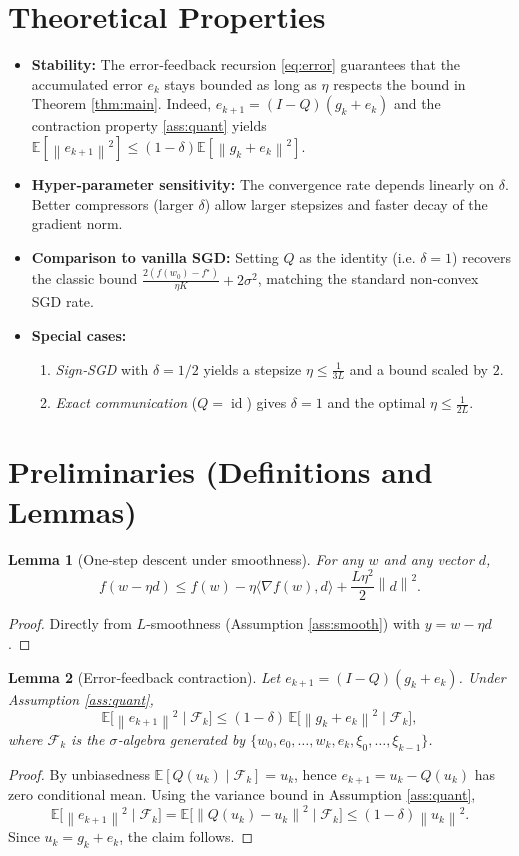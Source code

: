 \documentclass{article}
\newcommand{\E}{\mathbb{E}}
\newcommand{\norm}[1]{\left\|#1\right\|}
\newtheorem{lemma}{Lemma}
\begin{document}
\section*{Theoretical Properties}
\begin{itemize}
\item \textbf{Stability:} The error‑feedback recursion \eqref{eq:error} guarantees that the accumulated error $e_k$ stays bounded as long as $\eta$ respects the bound in Theorem \ref{thm:main}. Indeed, $e_{k+1}= (I-Q)(g_k+e_k)$ and the contraction property \eqref{ass:quant} yields $\E[\norm{e_{k+1}}^2]\le (1-\delta)\E[\norm{g_k+e_k}^2]$.
\item \textbf{Hyper‑parameter sensitivity:} The convergence rate depends linearly on $\delta$. Better compressors (larger $\delta$) allow larger stepsizes and faster decay of the gradient norm.
\item \textbf{Comparison to vanilla SGD:} Setting $Q$ as the identity (i.e. $\delta=1$) recovers the classic bound $\frac{2(f(w_0)-f^\star)}{\eta K}+2\sigma^2$, matching the standard non‑convex SGD rate.
\item \textbf{Special cases:}
    \begin{enumerate}
        \item \textit{Sign‑SGD} with $\delta=1/2$ yields a stepsize $\eta\le \frac{1}{3L}$ and a bound scaled by $2$.
        \item \textit{Exact communication} ($Q=\operatorname{id}$) gives $\delta=1$ and the optimal $\eta\le \frac{1}{2L}$.
    \end{enumerate}
\end{itemize}

\section*{Preliminaries (Definitions and Lemmas)}
\begin{lemma}[One‑step descent under smoothness]\label{lem:descent}
For any $w$ and any vector $d$,
\[
f(w-\eta d)\le f(w)-\eta\langle\nabla f(w),d\rangle+\frac{L\eta^{2}}{2}\norm{d}^{2}.
\]
\end{lemma}
\begin{proof}
Directly from $L$‑smoothness (Assumption \ref{ass:smooth}) with $y=w-\eta d$.
\end{proof}

\begin{lemma}[Error‑feedback contraction]\label{lem:error}
Let $e_{k+1}= (I-Q)(g_k+e_k)$. Under Assumption \ref{ass:quant},
\[
\E\!\big[\norm{e_{k+1}}^{2}\mid\mathcal{F}_k\big]\le (1-\delta)\,\E\!\big[\norm{g_k+e_k}^{2}\mid\mathcal{F}_k\big],
\]
where $\mathcal{F}_k$ is the $\sigma$‑algebra generated by $\{w_0,e_0,\dots,w_k,e_k,\xi_0,\dots,\xi_{k-1}\}$.
\end{lemma}
\begin{proof}
By unbiasedness $\E[Q(u_k)\mid\mathcal{F}_k]=u_k$, hence $e_{k+1}=u_k-Q(u_k)$ has zero conditional mean. Using the variance bound in Assumption \ref{ass:quant},
\[
\E\!\big[\norm{e_{k+1}}^{2}\mid\mathcal{F}_k\big]
 =\E\!\big[\norm{Q(u_k)-u_k}^{2}\mid\mathcal{F}_k\big]
 \le (1-\delta)\norm{u_k}^{2}.
\]
Since $u_k=g_k+e_k$, the claim follows.
\end{proof}
\end{document}

